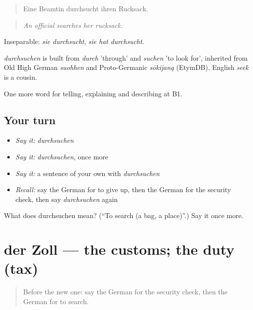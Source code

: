 \begin{quote}
Eine Beamtin durchsucht ihren Rucksack.
\end{quote}

\begin{quote}
\emph{An official searches her rucksack.}
\end{quote}

Inseparable: \emph{sie durchsucht}, \emph{sie hat durchsucht}.

\begin{cousinweb}
\emph{durchsuchen} is built from \emph{durch} 'through' and \emph{suchen} 'to look for', inherited from Old High German \emph{suohhen} and Proto-Germanic \emph{sōkijaną} (EtymDB). English \emph{seek} is a cousin.
\end{cousinweb}

\begin{grammarlens}[title={What you've built}]
One more word for telling, explaining and describing at B1.
\end{grammarlens}

\subsection*{Your turn}
\begin{itemize}
\raggedright
  \item \emph{Say it:} \emph{durchsuchen}
  \item \emph{Say it:} \emph{durchsuchen}, once more
  \item \emph{Say it:} a sentence of your own with \emph{durchsuchen}
  \item \emph{Recall:} say the German for to give up, then the German for the security check, then say \emph{durchsuchen} again
\end{itemize}

\begin{tcolorbox}[breakable,colback=teal!4,colframe=teal!35!black,title={Before you move on}]
What does durchsuchen mean? (\textquotedblleft{}To search (a bag, a place)\textquotedblright{}.) Say it once more.
\end{tcolorbox}
\section[der Zoll]{der Zoll — the customs; the duty (tax)}

\label{lesson:GE-C417-zoll}



\begin{quote}
Before the new one: say the German for the security check, then the German for to search.
\end{quote}

